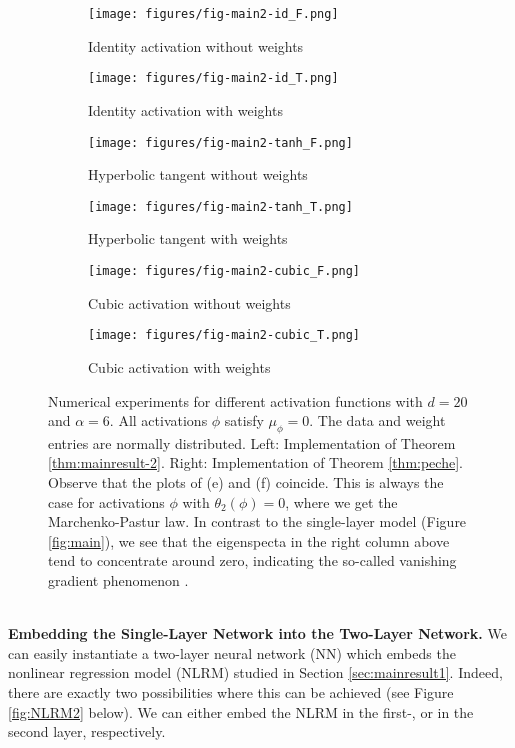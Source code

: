 \documentclass{article}
\begin{document}
\begin{figure}[htbp]
    \centering
    \begin{subfigure}{0.4\textwidth}
        \texttt{[image: figures/fig-main2-id\_F.png]}
        \caption{Identity activation without weights}
    \end{subfigure}
    \hfill
    \begin{subfigure}{0.4\textwidth}
        \texttt{[image: figures/fig-main2-id\_T.png]}
        \caption{Identity activation with weights}
    \end{subfigure}
    \hfill
    \begin{subfigure}{0.4\textwidth}
        \texttt{[image: figures/fig-main2-tanh\_F.png]}
        \caption{Hyperbolic tangent without weights}
    \end{subfigure}
    \hfill
    \begin{subfigure}{0.4\textwidth}
        \texttt{[image: figures/fig-main2-tanh\_T.png]}
        \caption{Hyperbolic tangent with weights}
    \end{subfigure}
    \hfill
    \begin{subfigure}{0.4\textwidth}
        \texttt{[image: figures/fig-main2-cubic\_F.png]}
        \caption{Cubic activation without weights}
    \end{subfigure}
    \hfill
    \begin{subfigure}{0.4\textwidth}
        \texttt{[image: figures/fig-main2-cubic\_T.png]}
        \caption{Cubic activation with weights}
    \end{subfigure}
    \caption{Numerical experiments for different activation functions with $d=20$ and $\alpha=6$. All activations $\phi$ satisfy $\mu_\phi=0$. The data and weight entries are normally distributed. Left: Implementation of Theorem \ref{thm:mainresult-2}. Right: Implementation of Theorem \ref{thm:peche}. Observe that the plots of (e) and (f) coincide. This is always the case for activations $\phi$ with $\theta_2(\phi)=0$, where we get the Marchenko-Pastur law. In contrast to the single-layer model (Figure \ref{fig:main}), we see that the eigenspecta in the right column above tend to concentrate around zero, indicating the so-called vanishing gradient phenomenon \cite{orvieto}.}
    \label{fig:main-II}
\end{figure}
\bigskip
\bigskip
\\
\textbf{Embedding the Single-Layer Network into the Two-Layer Network.} We can easily instantiate a two-layer neural network (NN) which embeds the nonlinear regression model (NLRM) studied in Section \ref{sec:mainresult1}. Indeed, there are exactly two possibilities where this can be achieved (see Figure \ref{fig:NLRM2} below). We can either embed the NLRM in the first-, or in the second layer, respectively.
\end{document}
